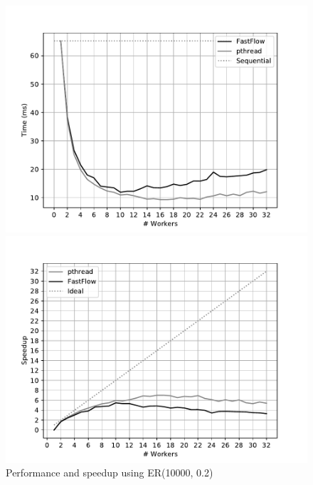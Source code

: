 \begin{figure}[!htb]
    \centering
    \begin{minipage}{0.48\textwidth}
        \includegraphics[width=\textwidth]{plots/fastflow_performance_02_time.pdf}
    \end{minipage}
    \begin{minipage}{0.48\textwidth}
        \includegraphics[width=\textwidth]{plots/fastflow_speedup_02_time.pdf}
    \end{minipage}
    \caption{Performance and speedup using ER(10000, 0.2)}
    \label{fig:perf_02}
    \begin{minipage}{1\textwidth}
    \end{minipage}
    \begin{minipage}{0.48\textwidth}

\end{minipage}
\end{figure}
